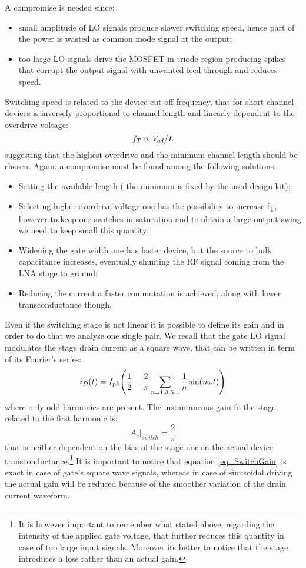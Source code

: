 A compromise is needed since:
\begin{itemize}
	\item small amplitude of LO signals produce slower switching speed, hence part of the power is wasted as common mode signal at the output;
	\item too large LO signals drive the MOSFET in triode region producing spikes that corrupt the output signal with unwanted feed-through  and reduces speed.
\end{itemize}
Switching speed is related to the device cut-off frequency, that for short channel devices is inversely proportional to channel length and linearly dependent to the overdrive voltage:
\begin{equation}
f_T \propto  V_{od}/L \notag
\end{equation}
suggesting that the highest overdrive and the minimum channel length should be chosen. Again, a compromise must be found among the following solutions:
\begin{itemize}
	\item Setting the available length ( the minimum is fixed by the used design kit);
	\item Selecting higher overdrive voltage one has the possibility to increase f\textsubscript{T}, however to keep our switches in saturation and to obtain a large output swing we need to keep small this quantity;
	\item Widening the gate width one has faster device, but the source to bulk capacitance increases, eventually shunting the RF signal coming from the LNA stage to ground;
	\item Reducing the current a faster commutation is achieved, along with lower transconductance though.
\end{itemize}

Even if the switching stage is not linear it is possible to define its gain and in order to do that we analyse one single pair. We recall that the gate LO signal modulates the stage drain current as a square wave, that can be written in term of its Fourier's series:
\begin{equation}
 i_D(t)=I_{pk}\Bigg(\frac{1}{2}-\frac{2}{\pi} \sum_{n=1,3,5 \dots}^{} \frac{1}{n}\sin(n\omega t)\Bigg) \notag
\end{equation} 
where only odd harmonics are present. The instantaneous gain fo the stage, related to the first harmonic is:
\begin{equation}
\label{eq_SwitchGain}
A_c|_{switch} = \frac{2}{\pi}
\end{equation}
that is neither dependent on the bias of the stage nor on the actual device transconductance.\footnote{It is however important to remember what stated above, regarding the intensity of the applied gate voltage, that further reduces this quantity in case of too large input signals. Moreover its better to notice that the stage introduces a loss rather than an actual gain.} It is important to notice that equation \ref{eq_SwitchGain} is exact in case of gate's square wave signals, whereas in case of sinusoidal driving the actual gain will be reduced because of the smoother variation of the drain current waveform.

